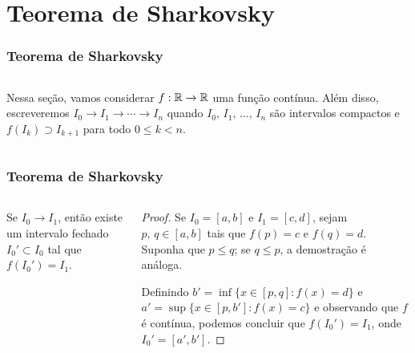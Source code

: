 \section{Teorema de Sharkovsky}


\begin{frame}
\vspace{5pt}
\frametitle{Teorema de Sharkovsky}
\begin{columns}
\column{\dimexpr\paperwidth-15pt}

Nessa seção, vamos considerar $f: \mathbb{R} \to \mathbb{R}$ uma função contínua.
Além disso, escreveremos $I_0 \longrightarrow I_1 \longrightarrow \cdots \longrightarrow I_n$ quando $I_0, \, I_1, \, \dots, \, I_n$ são intervalos compactos e $f(I_k) \supset I_{k+1}$ para todo $0 \leq k < n$.

\end{columns}
\end{frame}


\begin{frame}
\vspace{5pt}
\frametitle{Teorema de Sharkovsky}
\begin{columns}
\column{\dimexpr\paperwidth-15pt}

\begin{proposition}
Se $I_0 \longrightarrow I_1$, então existe um intervalo fechado $I_0' \subset I_0$ tal que $f(I_0') = I_1$.
\end{proposition}

\begin{proof}
Se $I_0 = [a, b]$ e $I_1 = [c, d]$, sejam $p, \, q \in [a, b]$ tais que $f(p) = c$ e $f(q) = d$.
Suponha que $p \leq q$; se $q \leq p$, a demostração é análoga.

Definindo $b' = \inf \lbrace x \in [p, q] : f(x) = d \rbrace$ e $a' = \sup \lbrace x \in [p, b'] : f(x) = c \rbrace$ e observando que $f$ é contínua, podemos concluir que $f(I_0') = I_1$, onde $I_0' = [a', b']$.
\end{proof}

\end{columns}
\end{frame}



